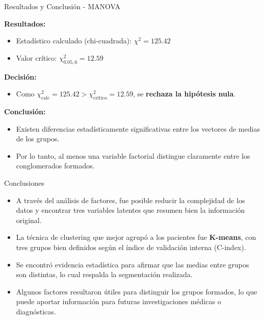 \documentclass[
	11pt, %
]{beamer}
\begin{document}
\begin{frame}{Resultados y Conclusión - MANOVA}

\textbf{Resultados:}
\begin{itemize}
    \item Estadístico calculado (chi-cuadrada): $\chi^2 = 125.42$
    \item Valor crítico: $\chi^2_{0.05, 6} = 12.59$
\end{itemize}

\vspace{0.4cm}
\textbf{Decisión:}
\begin{itemize}
    \item Como $\chi^2_{\text{calc}} = 125.42 > \chi^2_{\text{crítico}} = 12.59$, se \textbf{rechaza la hipótesis nula}.
\end{itemize}

\vspace{0.4cm}
\textbf{Conclusión:}
\begin{itemize}
    \item Existen diferencias estadísticamente significativas entre los vectores de medias de los grupos.
    \item Por lo tanto, al menos una variable factorial distingue claramente entre los conglomerados formados.
\end{itemize}

\end{frame}

\begin{frame}{Conclusiones}
\begin{itemize}
    
    \item A través del análisis de factores, fue posible reducir la complejidad de los datos y encontrar tres variables latentes que resumen bien la información original.

    \item La técnica de clustering que mejor agrupó a los pacientes fue \textbf{K-means}, con tres grupos bien definidos según el índice de validación interna (C-index).

    \item Se encontró evidencia estadística para afirmar que las medias entre grupos son distintas, lo cual respalda la segmentación realizada.

    \item Algunos factores resultaron útiles para distinguir los grupos formados, lo que puede aportar información para futuras investigaciones médicas o diagnósticas.
\end{itemize}
\end{frame}
\end{document}
